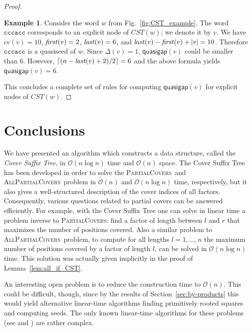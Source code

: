 \documentclass{article}
\theoremstyle{theorem}
\theoremstyle{definition}
\newtheorem{example}{Example}
\newcommand{\CST}{\mathit{CST}}
\newcommand{\firstocc}{\mbox{\textit{first}}}
\newcommand{\lastocc}{\mbox{\textit{last}}}
\renewcommand{\c}{\mathit{cv}}
\newcommand{\Oh}{\mathcal{O}}
\newcommand{\PC}{{\textsc{PartialCovers}}}
\newcommand{\APC}{{\textsc{AllPartialCovers}}}
\begin{document}
\begin{proof}
    \begin{example}
      Consider the word $w$ from Fig.~\ref{fig:CST_example}.
      The word $\texttt{cccacc}$ corresponds to an explicit node of $\CST(w)$; we denote it by $v$.
      We have $\c(v)=10$, $\firstocc(v)=2$, $\lastocc(v)=6$, and $\lastocc(v) - \firstocc(v) + |v|=10$.
      Therefore $\texttt{cccacc}$ is a quasiseed of $w$. 
      Since $\Delta(v)=1$, $\textsf{quasigap}(v)$ could be smaller than 6.
      However, $\lceil (n-\lastocc(v)+2)/2 \rceil=6$ and the above formula yields $\textsf{quasigap}(v)=6$.
    \end{example}

    \noindent
    This concludes a complete set of rules for computing $\textsf{quasigap}(v)$ for explicit nodes of $\CST(w)$.
  \end{proof}


  \section{Conclusions}\label{sec:conclusions}
  We have presented an algorithm which constructs a data structure, called the
  {\em Cover Suffix Tree}, in $\Oh(n\log n)$ time and $\Oh(n)$ space.
  The Cover Suffix Tree has been developed in order to solve the
  \PC\ and \APC\ problem in $\Oh(n)$ and $\Oh(n\log n)$ time,
  respectively, but it also gives a well-structured description of the cover indices of all factors.
  Consequently, various questions related to partial covers can be answered efficiently.
  For example, with the Cover Suffix Tree one can solve in linear time a
  problem inverse to \PC:
  find a factor of length between $l$ and $r$ that maximizes the number of positions covered.
  Also a similar problem to \APC\ problem,
  to compute for all lengths $l=1,\ldots,n$ the maximum number of positions covered by a factor of length $l$,
  can be solved in $\Oh(n\log n)$ time.
  This solution was actually given implicitly in the proof of Lemma~\ref{lem:all_if_CST}.

  An interesting open problem is to reduce the construction time to $\Oh(n)$.
  This could be difficult, though, since by the results of Section~\ref{sec:by-products}
  this would yield alternative linear-time algorithms finding primitively rooted squares
  and computing seeds.
  The only known linear-time algorithms for these problems
  (see \cite{DBLP:journals/jcss/GusfieldS04,Crochemore2013,DBLP:conf/spire/CrochemoreIKRRW10} and \cite{DBLP:conf/soda/KociumakaKRRW12})
  are rather complex.

   
  
  
\end{document}
